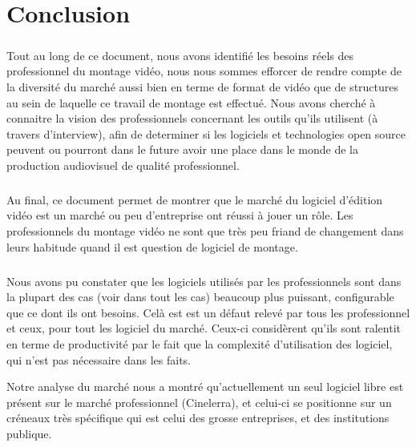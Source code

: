 \newpage \chapter{Conclusion}

\paragraph{}

Tout au long de ce document, nous avons identifié les besoins réels
des professionnel du montage vidéo, nous nous sommes efforcer de rendre
compte de la diversité du marché aussi bien en terme de format de
vidéo que de structures au sein de laquelle ce travail de montage est
effectué. Nous avons  cherché à connaitre la vision des professionnels
concernant les outils qu'ils utilisent (à travers d'interview), afin
de determiner si les logiciels et technologies open source peuvent ou
pourront dans le future avoir une place dans le monde de la production
audiovisuel de qualité professionnel.

\paragraph{}

Au final, ce document permet de montrer que le marché du logiciel
d'édition vidéo est un marché ou peu d'entreprise ont réussi à
jouer un rôle. Les professionnels du montage vidéo ne sont que très
peu friand de changement dans leurs habitude quand il est question de
logiciel de montage.

\paragraph{}

Nous avons pu constater que les logiciels utilisés par les professionnels
sont dans la plupart des cas (voir dans tout les cas) beaucoup plus
puissant, configurable que ce dont ils ont besoins. Celà est est
un défaut relevé par tous les professionnel et ceux, pour tout les
logiciel du marché. Ceux-ci considèrent qu'ils sont ralentit en terme de
productivité par le fait que la complexité d'utilisation des logiciel,
qui n'est pas nécessaire dans les faits.

Notre analyse du marché nous a montré qu'actuellement un seul logiciel
libre est présent sur le marché professionnel (Cinelerra), et celui-ci
se positionne sur un créneaux très spécifique qui est celui des grosse
entreprises, et des institutions publique.

